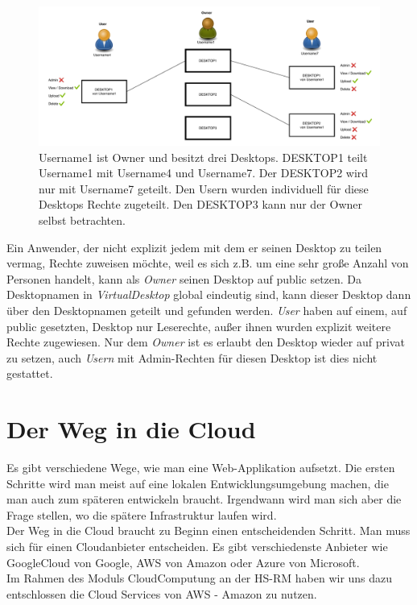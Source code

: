 \documentclass[a4paper, 12pt]{scrreprt}
\begin{document}
\begin{figure}[h]
\centering
\includegraphics[scale=0.45]{VD_konzept.pdf}
\caption{Username1 ist Owner und besitzt drei Desktops. DESKTOP1 teilt Username1 mit Username4 und Username7. Der DESKTOP2 wird nur mit Username7 geteilt. Den Usern wurden individuell für diese Desktops Rechte zugeteilt. Den DESKTOP3 kann nur der Owner selbst betrachten.}
\end{figure}

\noindent Ein Anwender, der nicht explizit jedem mit dem er seinen Desktop zu teilen vermag, Rechte zuweisen möchte, weil es sich z.B. um eine sehr große Anzahl von Personen handelt, kann als \textit{Owner} seinen Desktop auf public setzen.
Da Desktopnamen in \textit{VirtualDesktop} global eindeutig sind, kann dieser Desktop dann über den Desktopnamen geteilt und gefunden werden.
\textit{User} haben auf einem, auf public gesetzten, Desktop nur Leserechte, außer ihnen wurden explizit weitere Rechte zugewiesen. 
Nur dem \textit{Owner} ist es erlaubt den Desktop wieder auf privat zu setzen, auch \textit{Usern} mit Admin-Rechten für diesen Desktop ist dies nicht gestattet.
 

\chapter{Der Weg in die Cloud}
Es gibt verschiedene Wege, wie man eine Web-Applikation aufsetzt. Die ersten Schritte wird man meist auf eine lokalen Entwicklungsumgebung machen, die man auch zum späteren entwickeln braucht. Irgendwann wird man sich aber die Frage stellen, wo die spätere Infrastruktur laufen wird. \\
Der Weg in die Cloud braucht zu Beginn einen entscheidenden Schritt. Man muss sich für einen Cloudanbieter entscheiden. Es gibt verschiedenste Anbieter wie GoogleCloud von Google, AWS von Amazon oder Azure von Microsoft. \\
Im Rahmen des Moduls CloudComputung an der HS-RM haben wir uns dazu entschlossen die Cloud Services von AWS - Amazon zu nutzen.
\end{document}
